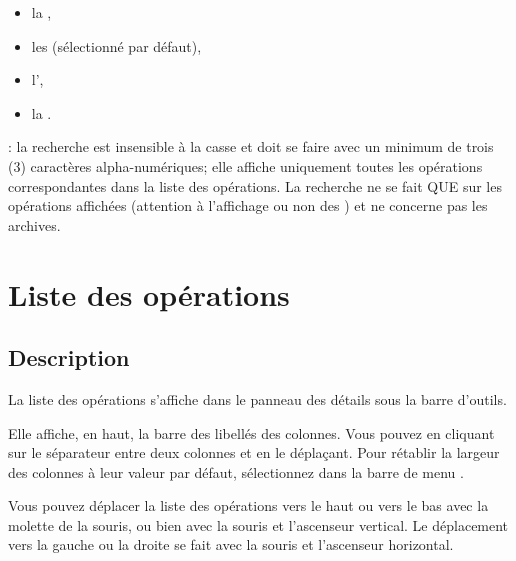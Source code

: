\begin{itemize}
\begin{itemize}
			\item la ,
			\item les  (sélectionné par défaut),
			\item l',
			\item la .
		\end{itemize}
	\Note{}: la recherche est insensible à la casse et doit se faire avec un minimum de trois (3) caractères alpha-numériques; elle affiche uniquement toutes les opérations correspondantes dans la liste des opérations. La recherche ne se fait QUE sur les opérations affichées (attention à l'affichage ou non des ) et ne concerne pas les archives. 
\end{itemize}


\section{Liste des opérations\label{transactions-list}}


\subsection{Description\label{transactions-list-description}}

La liste des opérations s'affiche dans le panneau des détails sous la barre d'outils.

Elle affiche, en haut, la barre des libellés des colonnes. Vous pouvez  en cliquant sur le séparateur entre deux colonnes et en le déplaçant. Pour rétablir la largeur des colonnes à leur valeur par défaut, sélectionnez dans la barre de menu .

Vous pouvez déplacer la liste des opérations vers le haut ou vers le bas avec la molette de la souris, ou bien avec la souris et l'ascenseur vertical. Le déplacement vers la gauche ou la droite se fait avec la souris et l'ascenseur horizontal.

